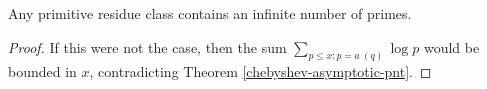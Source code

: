 \begin{corollary}
\label{dirichlet_thm}
\leanok
Any primitive residue class contains an infinite number of primes.
\end{corollary}
\begin{proof}
\leanok
If this were not the case, then the sum $\sum_{p \leq x: p = a\ (q)} \log p$
  would be bounded in $x$, contradicting Theorem \ref{chebyshev-asymptotic-pnt}.
\end{proof}
